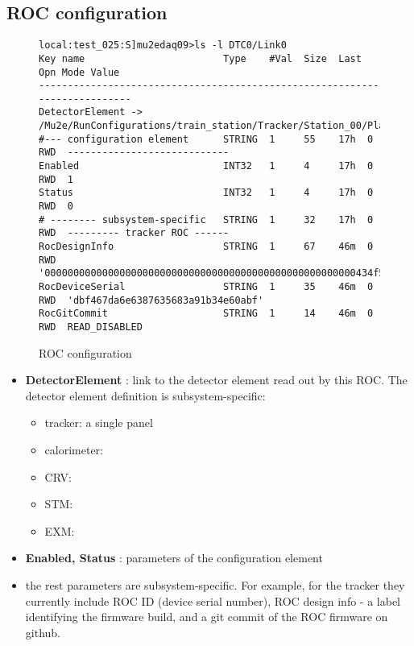\subsection {ROC configuration}

\begin{figure}[H]
{ \scriptsize
\begin{verbatim}
local:test_025:S]mu2edaq09>ls -l DTC0/Link0
Key name                        Type    #Val  Size  Last Opn Mode Value
---------------------------------------------------------------------------
DetectorElement -> /Mu2e/RunConfigurations/train_station/Tracker/Station_00/Plane_00/Panel_00
#--- configuration element      STRING  1     55    17h  0   RWD  ----------------------------
Enabled                         INT32   1     4     17h  0   RWD  1
Status                          INT32   1     4     17h  0   RWD  0
# -------- subsystem-specific   STRING  1     32    17h  0   RWD  --------- tracker ROC ------
RocDesignInfo                   STRING  1     67    46m  0   RWD  '000000000000000000000000000000000000000000000000000000434f52c7ef'
RocDeviceSerial                 STRING  1     35    46m  0   RWD  'dbf467da6e6387635683a91b34e60abf'
RocGitCommit                    STRING  1     14    46m  0   RWD  READ_DISABLED
\end{verbatim}
}
\caption{
  \label{figure:roc_config}
  ROC configuration
}
\end{figure}

\begin{itemize}
\item
  {\bf DetectorElement} : link to the detector element read out by this ROC.
  The detector element definition is subsystem-specific:
  \begin{itemize}
  \item
    tracker: a single panel
  \item
    calorimeter: 
  \item
    CRV: 
  \item
    STM:
  \item
    EXM: 
  \end{itemize}
\item
  {\bf Enabled, Status} : parameters of the configuration element
\item
  the rest parameters are subsystem-specific. For example, for the tracker they currently include ROC ID (device serial number),
  ROC design info - a label identifying the firmware build, and a git commit of the ROC firmware on github. 
\end{itemize}

